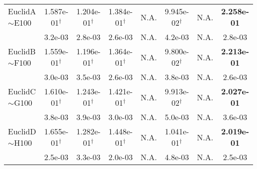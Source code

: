 {\begin{longtable}[c]{lccccccc}
    EuclidA$\sim$E100        & 1.587e-01$^{\dag}$ & 1.204e-01$^{\dag}$ & 1.384e-01$^{\dag}$ & N.A.               & 9.945e-02$^{\dag}$ & N.A.                   & \textbf{2.258e-01} \\
                                            & 3.2e-03            & 2.8e-03            & 2.6e-03            & N.A.               & 4.2e-03            & N.A.                            & 2.8e-03            \\
    \midrule
    EuclidB$\sim$F100       & 1.559e-01$^{\dag}$ & 1.196e-01$^{\dag}$ & 1.364e-01$^{\dag}$ & N.A.               & 9.800e-02$^{\dag}$ & N.A.                & \textbf{2.213e-01} \\
                                            & 3.0e-03            & 3.5e-03            & 2.6e-03            & N.A.               & 3.8e-03            & N.A.            & 2.6e-03            \\
    \midrule
    EuclidC$\sim$G100        & 1.610e-01$^{\dag}$ & 1.243e-01$^{\dag}$ & 1.421e-01$^{\dag}$ & N.A.               & 9.913e-02$^{\dag}$ & N.A.              & \textbf{2.027e-01} \\
                                            & 3.8e-03            & 3.9e-03            & 3.0e-03            & N.A.               & 5.0e-03            & N.A.            & 3.6e-03            \\
    \midrule
    EuclidD$\sim$H100       & 1.655e-01$^{\dag}$ & 1.282e-01$^{\dag}$ & 1.448e-01$^{\dag}$ & N.A.               & 1.041e-01$^{\dag}$ & N.A.             & \textbf{2.019e-01} \\
                                            & 2.5e-03            & 3.3e-03            & 2.0e-03            & N.A.               & 4.8e-03            & N.A.            & 2.5e-03            \\
    \midrule


\end{longtable}}
